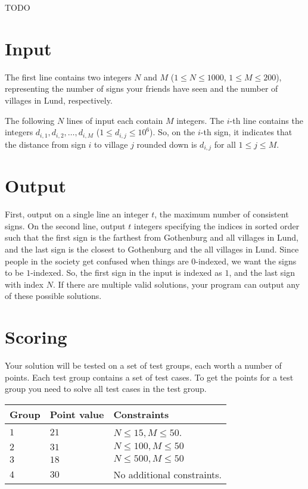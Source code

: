 \noindent

TODO



\section*{Input}
\noindent
The first line contains two integers $N$ and $M$ ($1 \leq N \leq 1000$, $1 \leq M \leq 200$), 
representing the number of signs your friends have seen and the number of villages in Lund, respectively.

The following $N$ lines of input each contain $M$ integers. The $i$-th line contains the integers $d_{i,1}, d_{i,2}, \ldots, d_{i,M}$ ($1 \leq d_{i,j} \leq 10^6$). 
So, on the $i$-th sign, it indicates that the distance from sign $i$ to village $j$ rounded down is $d_{i,j}$ for all $1 \leq j \leq M$.

\section*{Output}
\noindent
First, output on a single line an integer $t$, the maximum number of consistent signs.
On the second line, output $t$ integers specifying the indices in sorted order such that the first sign is the farthest from Gothenburg and all villages in Lund, 
and the last sign is the closest to Gothenburg and the all villages in Lund.
Since people in the society get confused when things are $0$-indexed, we want the signs to be $1$-indexed. 
So, the first sign in the input is indexed as $1$, and the last sign with index $N$.
If there are multiple valid solutions, your program can output any of these possible solutions.

\section*{Scoring}
Your solution will be tested on a set of test groups, each worth a number of points. 
Each test group contains a set of test cases. 
To get the points for a test group you need to solve all test cases in the test group.

\noindent
\begin{tabular}{| l | l | p{12cm} |}
  \hline
  \textbf{Group} & \textbf{Point value} & \textbf{Constraints} \\ \hline
  $1$    & $21$         & $N \leq 15, M \leq 50$.  \\ \hline
  $2$    & $31$         & $N \leq 100, M \leq 50$ \\ \hline
  $3$    & $18$         & $N \leq 500, M \leq 50$ \\ \hline
  $4$    & $30$         & No additional constraints. \\ \hline
\end{tabular}



